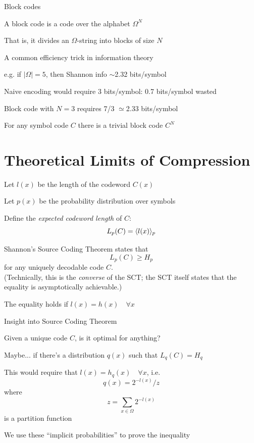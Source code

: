 \documentclass{beamer}
\begin{document}
\begin{frame}{Block codes}

\itemb
\item A \alert{block code} is a code over the alphabet $\Omega^N$
\item That is, it divides an $\Omega$-string into blocks of size $N$
\item A common efficiency trick in information theory
 \itemb
 \item e.g. if $|\Omega|=5$, then Shannon info $\sim$2.32 bits/symbol
 \item Naive encoding would require 3 bits/symbol: 0.7 bits/symbol wasted
 \item Block code with $N=3$ requires 7/3 $\simeq$2.33 bits/symbol
 \iteme
\item For any symbol code $C$ there is a trivial block code $C^N$
\iteme

\end{frame}

\section{Theoretical Limits of Compression}

\begin{frame}

\itemb
\item Let $l(x)$ be the length of the codeword $C(x)$
\item Let $p(x)$ be the probability distribution over symbols
\item Define the {\em expected codeword length} of $C$:
\[
L_p(C) = \langle l(x) \rangle_p
\]
\item \alert{Shannon's Source Coding Theorem} states that
\[
L_p(C) \geq H_p
\]
for any uniquely decodable code $C$. \\
(Technically, this is the {\em converse} of the SCT; the SCT itself states that the equality is asymptotically achievable.)
\item The equality holds if $l(x) = h(x) \quad \forall x$
\iteme

\end{frame}

\begin{frame}{Insight into Source Coding Theorem}

\itemb
\item Given a unique code $C$, is it optimal for anything?
\item Maybe... if there's a distribution $q(x)$ such that $L_q(C) = H_q$
\item This would require that $l(x) = h_q(x) \quad \forall x$, i.e.
\[
q(x) = 2^{-l(x)} / z
\]
where
\[
z = \sum_{x \in {\Omega}} 2^{-l(x)}
\]
is a \alert{partition function}
\item We use these ``implicit probabilities'' to prove the inequality
\iteme

\end{frame}
\end{document}
